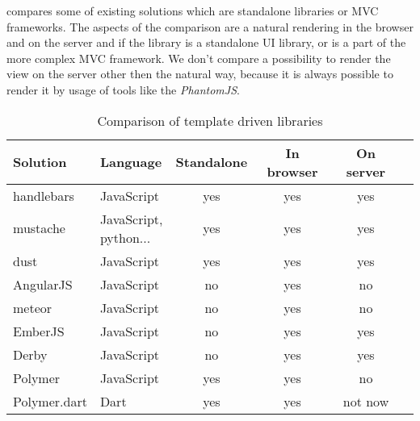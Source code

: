    compares some of existing solutions which are standalone libraries or MVC frameworks.
  The aspects of the comparison are a natural rendering in the browser and  on the server and if the library is a standalone UI library, 
  or is a part of the more complex MVC framework. 
  We don't compare a possibility to render the view on the server other then the natural way, 
  because it is always possible to render it by usage of tools like the \textit{PhantomJS}.

  \begin{table}
    \begin{tabular}{|l|l|c|c|c|c|}
      \hline
      \textbf{Solution}& \textbf{Language}   & \textbf{Standalone} & \textbf{In browser} & \textbf{On server} \\
      \hline
      handlebars       & JavaScript          &         yes         &        yes          &        yes         \\
      \hline
      {{mustache}}     & \shortstack{JavaScript,  
                            \\    python...} &        yes         &        yes          &        yes          \\
      \hline
      dust             & JavaScript          &         yes         &        yes          &        yes         \\
      \hline
      AngularJS        & JavaScript          &         no          &        yes          &        no          \\
      \hline
      meteor           & JavaScript          &         no          &        yes          &        no          \\
      \hline
      EmberJS          & JavaScript          &         no          &        yes          &        yes         \\
      \hline
      Derby            & JavaScript          &         no          &        yes          &        yes         \\
      \hline
      Polymer          & JavaScript          &         yes         &        yes          &        no          \\
      \hline
      Polymer.dart     & Dart                &         yes         &        yes          &      not now       \\
      \hline
    \end{tabular}
    \caption{Comparison of template driven libraries}
    \label{table:template-driven-libraries}
  \end{table}

